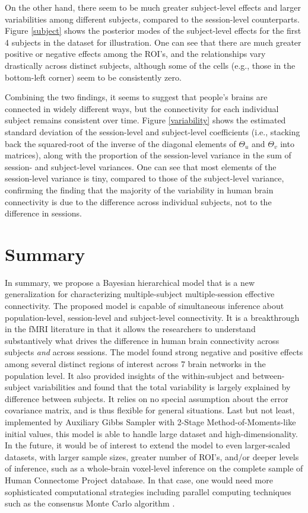 \documentclass[12pt]{elsarticle}
\begin{document}
		On the other hand, there seem to be much greater subject-level effects and larger variabilities among different subjects, compared to the session-level counterparts. 
		Figure \ref{subject} shows the posterior modes of the subject-level effects for the first 4 subjects in the dataset for illustration.
		One can see that there are much greater positive or negative effects among the ROI's, and the relationships vary drastically across distinct subjects, although some of the cells (e.g., those in the bottom-left corner) seem to be consistently zero. 
		
		
		Combining the two findings, it seems to suggest that people's brains are connected in widely different ways, but the connectivity for each individual subject remains consistent over time. 
		Figure \ref{variability} shows the estimated standard deviation of the session-level and subject-level coefficients (i.e., stacking back the squared-root of the inverse of the diagonal elements of $\Theta_u$ and $\Theta_v$ into matrices), along with the proportion of the session-level variance in the sum of session- and subject-level variances.
		One can see that most elements of the session-level variance is tiny, compared to those of the subject-level variance, confirming the finding that the majority of the variability in human brain connectivity is due to the difference across individual subjects, not to the difference in sessions.
		
		
		
		
		\section{Summary}
		In summary, we propose a Bayesian hierarchical model that is a new generalization for characterizing multiple-subject multiple-session effective connectivity.
		The proposed model is capable of simultaneous inference about population-level, session-level and subject-level connectivity.
		It is a breakthrough in the fMRI literature in that it allows the researchers to understand substantively what drives the difference in human brain connectivity across subjects \textit{and} across sessions.
		The model found strong negative and positive effects among several distinct regions of interest across 7 brain networks in the population level.
		It also provided insights of the within-subject and between-subject variabilities and found that the total variability is largely explained by difference between subjects.
		It relies on no special assumption about the error covariance matrix, and is thus flexible for general situations.
		Last but not least, implemented by Auxiliary Gibbs Sampler with 2-Stage Method-of-Moments-like initial values, this model is able to handle large dataset and high-dimensionality.
		In the future, it would be of interest to extend the model to even larger-scaled datasets, with larger sample sizes, greater number of ROI's, and/or deeper levels of inference, such as a whole-brain voxel-level inference on the complete sample of Human Connectome Project database. 
		In that case, one would need more sophisticated computational strategies including parallel computing techniques such as the consensus Monte Carlo algorithm \cite{Scott}.
		
\end{document}
